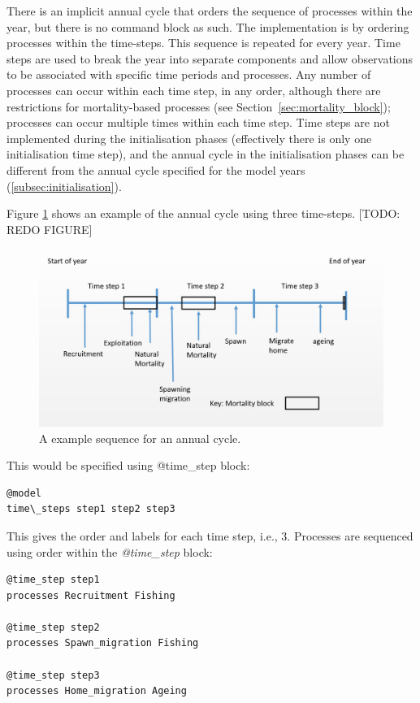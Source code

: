 There is an implicit annual cycle that orders the sequence of processes within the year, but there is no command block as such. The implementation is by ordering processes within the time-steps. This sequence is repeated for every year. Time steps are used to break the year into separate components and allow observations to be associated with specific time periods and processes. Any number of processes can occur within each time step, in any order, although there are restrictions for mortality-based processes (see Section~\ref{sec:mortality_block}); processes can occur multiple times within each time step. Time steps are not implemented during the initialisation phases (effectively there is only one initialisation time step), and the annual cycle in the initialisation phases can be different from the annual cycle specified for the model years (\ref{subsec:initialisation}). 

Figure \ref{Fig:annual} shows an example of the annual cycle using three time-steps.
[TODO: REDO FIGURE]

\begin{figure}[H]
	\centering
	\includegraphics[scale=0.5]{Figures/annual_cycle.jpg}
	\caption{A example sequence for an annual cycle.}\label{Fig:annual}
\end{figure}

This would be specified using @time\_step block:

{\small{\begin{verbatim}
@model
time\_steps step1 step2 step3
\end{verbatim}}}

This gives the order and labels for each time step, i.e., 3. Processes are sequenced using order within the \textit{@time\_step} block:

{\small{\begin{verbatim}
@time_step step1
processes Recruitment Fishing

@time_step step2
processes Spawn_migration Fishing

@time_step step3
processes Home_migration Ageing
\end{verbatim}}}

